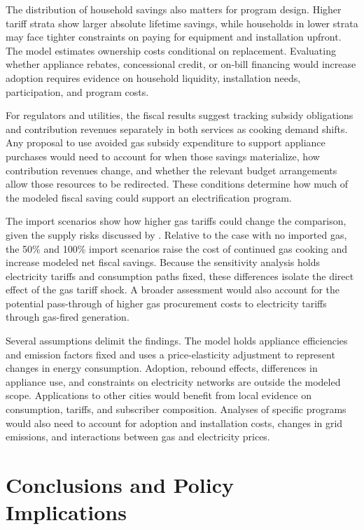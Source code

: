 \documentclass[authoryear,preprint,review,10pt]{elsarticle}
\begin{document}
The distribution of household savings also matters for program design. Higher tariff strata show larger absolute lifetime savings, while households in lower strata may face tighter constraints on paying for equipment and installation upfront. The model estimates ownership costs conditional on replacement. Evaluating whether appliance rebates, concessional credit, or on-bill financing would increase adoption requires evidence on household liquidity, installation needs, participation, and program costs.

For regulators and utilities, the fiscal results suggest tracking subsidy obligations and contribution revenues separately in both services as cooking demand shifts. Any proposal to use avoided gas subsidy expenditure to support appliance purchases would need to account for when those savings materialize, how contribution revenues change, and whether the relevant budget arrangements allow those resources to be redirected. These conditions determine how much of the modeled fiscal saving could support an electrification program.

The import scenarios show how higher gas tariffs could change the comparison, given the supply risks discussed by \citet{cabrales2025fedesarrollo_gas_imports}. Relative to the case with no imported gas, the 50\% and 100\% import scenarios raise the cost of continued gas cooking and increase modeled net fiscal savings. Because the sensitivity analysis holds electricity tariffs and consumption paths fixed, these differences isolate the direct effect of the gas tariff shock. A broader assessment would also account for the potential pass-through of higher gas procurement costs to electricity tariffs through gas-fired generation.

Several assumptions delimit the findings. The model holds appliance efficiencies and emission factors fixed and uses a price-elasticity adjustment to represent changes in energy consumption. Adoption, rebound effects, differences in appliance use, and constraints on electricity networks are outside the modeled scope. Applications to other cities would benefit from local evidence on consumption, tariffs, and subscriber composition. Analyses of specific programs would also need to account for adoption and installation costs, changes in grid emissions, and interactions between gas and electricity prices.

\section{Conclusions and Policy Implications}
\label{conclusions}
\end{document}

